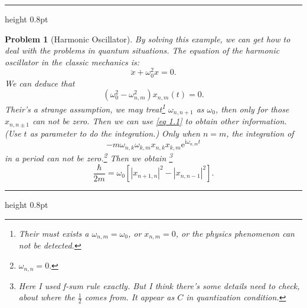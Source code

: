 \documentclass{article}
\newcommand{\singleline}{\hrule height 0.8pt}
\theoremstyle{1}
\newtheorem{problem}{Problem}[section]
\newcommand{\ii}{\mathrm{i}}
\newcommand{\ee}{\mathrm{e}}
\begin{document}
\singleline
\begin{problem}[Harmonic Oscillator]
\quad 
By solving this example, we can get how to deal with the problems in quantum situations.
The equation of the harmonic oscillator in the classic mechanics is:
\begin{equation}
    \ddot{x}+\omega_0^2x=0.
\end{equation}
We can deduce that 
\begin{equation}
    \left(\omega^2_0-\omega_{n,m}^2\right)x_{n,m}(t)=0.
\end{equation}
Their's a strange assumption, we may treat\footnote{Their must exists a $\omega_{n,m}=\omega_0$, or $x_{n,m}=0$, or the physics phenomenon can not be detected.} $\omega_{n,n+1}$ as $\omega_0$, then only for those $x_{n,n\pm1}$ can not be zero. Then we can use \eqref{eq 1.1} to obtain other information. (Use $t$ as parameter to do the integration.)
\newline
Only when $n=m$, the integration of 
\begin{equation}
    -m \omega_{n,k}\omega_{k,m}x_{n,k}x_{k,m}\ee^{\ii\omega_{n,m}t}
\end{equation}
 in a period can not be zero.\footnote{$\omega_{n,n}=0.$} Then we obtain \footnote{Here I used f-sum rule exactly. But I think there's some details need to check, about where the $\frac{1}{2}$ comes from. It appear as $C$ in quantization condition.}
 \begin{equation}
    \frac{\hbar}{2m}=\omega_0\left[\left|x_{n+1,n}\right|^2-\left|x_{n,n-1}\right|^2\right].
 \end{equation}
\end{problem}
\singleline
\end{document}
